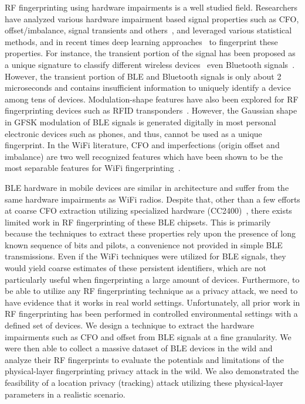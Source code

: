 RF fingerprinting using hardware impairments is a well studied field.
%
Researchers have analyzed various hardware impairment based signal properties such as CFO, \iq offset/imbalance, signal transients and others~\cite{Brik_radiometric,vohuuusrp,Intrusion_hall,deviceID_kose,suskitransient,roguewifi_liu,oscillator_azamehr}, and leveraged various statistical methods, and in recent times deep learning approaches~\cite{gopalakrishnan2019robust,denoising_yu,deeplearning_merchant} to fingerprint these properties. For instance, the transient portion of the signal has been proposed as a unique signature to 
classify different wireless devices~\cite{extraction_rehman, transientID_danev} even Bluetooth
signals~\cite{transientBT_Hall}. However, the transient portion of BLE and Bluetooth signals
is only about 2 microseconds and contains insufficient information to uniquely identify 
a device among tens of devices. Modulation-shape features have also been explored for RF
fingerprinting devices such as RFID transponders~\cite{rfidphysical_danev}. However, 
the Gaussian shape in GFSK modulation of BLE signals is generated digitally in most 
personal electronic devices such as phones, and thus, cannot be used as a unique fingerprint.
In the WiFi literature, CFO and \iq imperfections (\iq origin offset and \iq imbalance) are 
two well recognized features which have been shown to be the most separable features for 
WiFi fingerprinting~\cite{Brik_radiometric}. 

BLE hardware in mobile devices are similar in architecture and suffer from the same hardware impairments as WiFi radios.
%
Despite that, other than a few efforts at coarse CFO extraction utilizing specialized hardware (CC2400)~\cite{cvtracksun,blueshieldjain}, there exists limited work in RF fingerprinting of these BLE chipsets. 
%
This is primarily because the techniques to extract these properties rely upon the presence of long known sequence of bits and pilots, a convenience not provided in simple BLE transmissions.
%
Even if the WiFi techniques were utilized for BLE signals, they would yield coarse estimates of these persistent identifiers, which are not particularly useful when fingerprinting a large amount of devices.
%
Furthermore, to be able to utilize any RF fingerprinting technique as a privacy attack, we need to have evidence that it works in real world settings. 
%
Unfortunately, all prior work in RF fingerprinting has been performed in controlled environmental settings with a defined set of devices. 
%
We design a technique to extract the hardware impairments such as CFO and \iq offset from BLE signals at a fine granularity. We were then able to collect a massive dataset of BLE devices in the wild and analyze their RF fingerprints to evaluate the potentials and limitations of the physical-layer fingerprinting privacy attack in the wild. We also demonstrated the feasibility of a location privacy (tracking) attack utilizing these physical-layer parameters in a realistic scenario.







